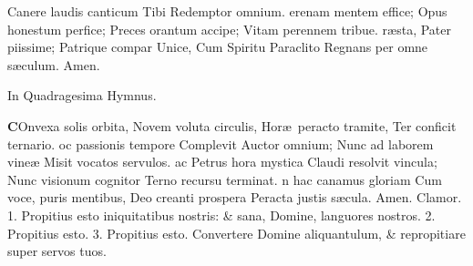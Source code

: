 \documentclass[letter,11pt]{book}
\begin{document}
\begin{multicols*}{2}
\newline \indent Canere laudis canticum
\newline \indent Tibi Redemptor omnium.
erenam mentem effice;
\newline \indent Opus honestum perfice;
\newline \indent Preces orantum accipe;
\newline \indent Vitam perennem tribue.
r\ae sta, Pater piissime;
\newline \indent Patrique compar Unice,
\newline \indent Cum Spiritu Paraclito
\newline \indent Regnans per omne s\ae culum. Amen.
\vspace{-.5em} \begin{center} \color{Red} In Quadragesima Hymnus. \end{center} \vspace{-.5em}
\lettrine[lines=2]{\bfseries \color{Red} C}{}Onvexa solis orbita,
\newline Novem voluta circulis,
\newline \indent Hor\ae \ peracto tramite,
\newline \indent Ter conficit ternario.
oc passionis tempore
\newline \indent Complevit Auctor omnium;
\newline \indent Nunc ad laborem vine\ae 
\newline \indent Misit vocatos servulos.
ac Petrus hora mystica
\newline \indent Claudi resolvit vincula;
\newline \indent Nunc visionum cognitor
\newline \indent Terno recursu terminat.
n hac canamus gloriam
\newline \indent Cum voce, puris mentibus,
\newline \indent Deo creanti prospera
\newline \indent Peracta justis s\ae cula. Amen.
\newline \color{Red} Clamor. 1. \color{black} Propitius esto iniquitatibus nostris: \& sana, Domine, languores nostros. \color{Red} 2. \color{black} Propitius esto. \color{Red} 3. \color{black} Propitius esto. Convertere Domine aliquantulum, \& repropitiare super servos tuos.

\end{multicols*}
\end{document}
